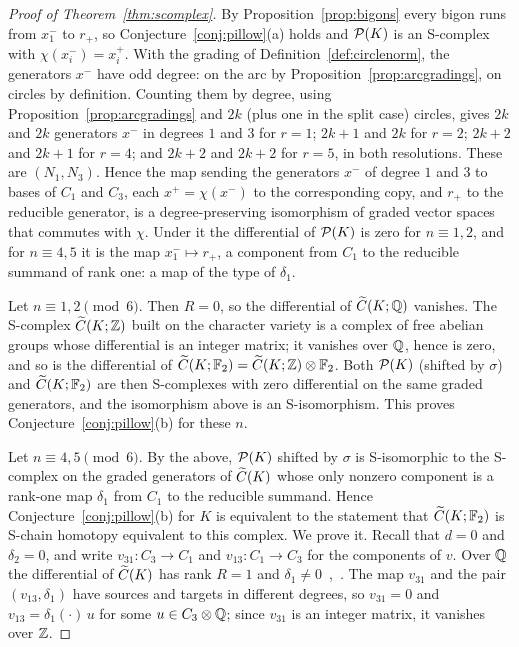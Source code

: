 \begin{proof}[Proof of Theorem~\ref{thm:scomplex}]
By Proposition~\ref{prop:bigons} every bigon runs from $x_1^-$ to $r_+$, so Conjecture~\ref{conj:pillow}(a) holds and
$\mathcal{P}(K)$ is an S-complex with $\chi(x_i^-)=x_i^+$. With the grading of Definition~\ref{def:circlenorm}, the
generators $x^-$ have odd degree: on the arc by Proposition~\ref{prop:arcgradings}, on circles by definition.
Counting them by degree, using Proposition~\ref{prop:arcgradings} and $2k$ (plus one in the split case)
circles, gives $2k$ and $2k$ generators $x^-$ in degrees $1$ and $3$ for $r=1$; $2k+1$ and $2k$ for $r=2$; $2k+2$ and
$2k+1$ for $r=4$; and $2k+2$ and $2k+2$ for $r=5$, in both resolutions. These are $(N_1,N_3)$. Hence the map sending
the generators $x^-$ of degree $1$ and $3$ to bases of $C_1$ and $C_3$, each $x^+=\chi(x^-)$ to the corresponding
copy, and $r_+$ to the reducible generator, is a degree-preserving isomorphism of graded vector spaces that
commutes with $\chi$. Under it the differential of $\mathcal{P}(K)$ is zero for $n\equiv1,2$, and for $n\equiv4,5$ it is the
map $x_1^-\mapsto r_+$, a component from $C_1$ to the reducible summand of rank one: a map of the type of $\delta_1$.

Let $n\equiv1,2\pmod6$. Then $R=0$, so the differential of $\widetilde C(K;\mathbb{Q})$ vanishes. The S-complex $\widetilde C(K;\mathbb{Z})$ built
on the character variety is a complex of free abelian groups whose differential is an integer matrix; it
vanishes over $\mathbb{Q}$, hence is zero, and so is the differential of $\widetilde C(K;\mathbb{F}_2)=\widetilde C(K;\mathbb{Z})\otimes\mathbb{F}_2$. Both $\mathcal{P}(K)$
(shifted by $\sigma$) and $\widetilde C(K;\mathbb{F}_2)$ are then S-complexes with zero differential on the same graded generators,
and the isomorphism above is an S-isomorphism. This proves Conjecture~\ref{conj:pillow}(b) for these $n$.

Let $n\equiv4,5\pmod6$. By the above, $\mathcal{P}(K)$ shifted by $\sigma$ is S-isomorphic to the S-complex on the graded
generators of $\widetilde C(K)$ whose only nonzero component is a rank-one map $\delta_1$ from $C_1$ to the reducible
summand. Hence Conjecture~\ref{conj:pillow}(b) for $K$ is equivalent to the statement that $\widetilde C(K;\mathbb{F}_2)$ is
S-chain homotopy equivalent to this complex. We prove it. Recall
that $d=0$ and $\delta_2=0$, and write $v_{31}\colon C_3\to C_1$ and $v_{13}\colon C_1\to C_3$ for the components of $v$. Over
$\mathbb{Q}$ the differential of $\widetilde C(K)$ has rank $R=1$ and $\delta_1\neq0$~\cite{W26},~\cite[\S9.5]{DSEquiv}. The map $v_{31}$ and the pair
$(v_{13},\delta_1)$ have sources and targets in different degrees, so $v_{31}=0$ and $v_{13}=\delta_1(\cdot)\,u$ for some
$u\in C_3\otimes\mathbb{Q}$; since $v_{31}$ is an integer matrix, it vanishes over $\mathbb{Z}$.


\end{proof}
